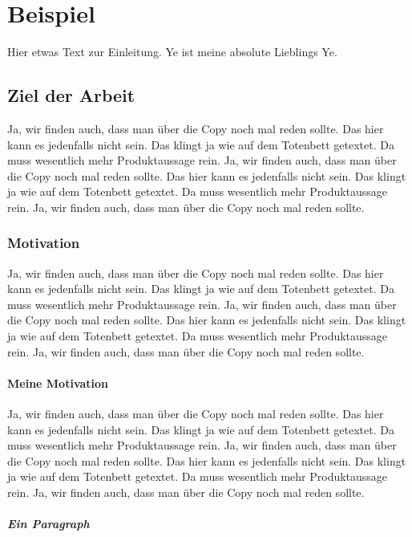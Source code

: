 
\chapter{Beispiel}

Hier etwas Text zur Einleitung. Ye ist meine absolute Lieblings Ye.

\section{Ziel der Arbeit}

Ja, wir finden auch, dass man über die Copy noch mal reden sollte. Das hier kann es jedenfalls nicht sein. Das klingt ja wie auf dem Totenbett getextet. Da muss wesentlich mehr Produktaussage rein. Ja, wir finden auch, dass man über die Copy noch mal reden sollte. Das hier kann es jedenfalls nicht sein. Das klingt ja wie auf dem Totenbett getextet. Da muss wesentlich mehr Produktaussage rein. Ja, wir finden auch, dass man über die Copy noch mal reden sollte.

\subsection{Motivation}

Ja, wir finden auch, dass man über die Copy noch mal reden sollte. Das hier kann es jedenfalls nicht sein. Das klingt ja wie auf dem Totenbett getextet. Da muss wesentlich mehr Produktaussage rein. Ja, wir finden auch, dass man über die Copy noch mal reden sollte. Das hier kann es jedenfalls nicht sein. Das klingt ja wie auf dem Totenbett getextet. Da muss wesentlich mehr Produktaussage rein. Ja, wir finden auch, dass man über die Copy noch mal reden sollte.

\subsubsection{Meine Motivation}

Ja, wir finden auch, dass man über die Copy noch mal reden sollte. Das hier kann es jedenfalls nicht sein. Das klingt ja wie auf dem Totenbett getextet. Da muss wesentlich mehr Produktaussage rein. Ja, wir finden auch, dass man über die Copy noch mal reden sollte. Das hier kann es jedenfalls nicht sein. Das klingt ja wie auf dem Totenbett getextet. Da muss wesentlich mehr Produktaussage rein. Ja, wir finden auch, dass man über die Copy noch mal reden sollte.

\paragraph{Ein Paragraph}

